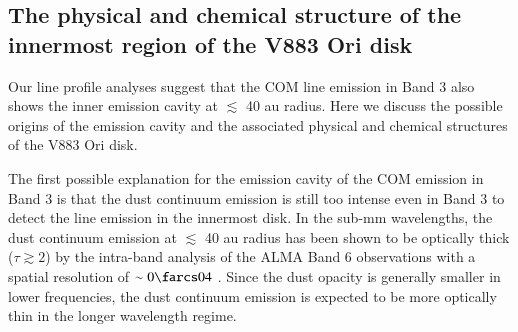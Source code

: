 \documentclass[twocolumn, twocolappendix, astrosymb, times]{aastex631}
\begin{document}



\subsection{The physical and chemical structure of the innermost region of the V883 Ori disk}\label{subsec:physicochemical_structure}
Our line profile analyses suggest that the COM line emission in Band 3 also shows the inner emission cavity at $\lesssim$ 40 au radius. Here we discuss the possible origins of the emission cavity and the associated physical and chemical structures of the V883 Ori disk. 


The first possible explanation for the emission cavity of the COM emission in Band 3 is that the dust continuum emission is still too intense even in Band 3 to detect the line emission in the innermost disk. In the sub-mm wavelengths, the dust continuum emission at $\lesssim$ 40 au radius has been shown to be optically thick ($\tau \gtrsim 2$) by the intra-band analysis of the ALMA Band 6 observations with a spatial resolution of $\sim0\farcs04$ \citep{Cieza2016}. Since the dust opacity is generally smaller in lower frequencies, the dust continuum emission is expected to be more optically thin in the longer wavelength regime. 
\end{document}
